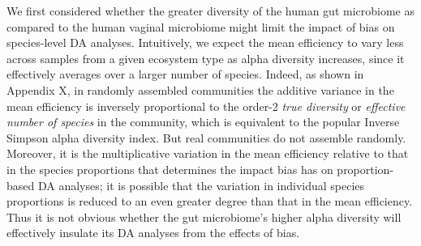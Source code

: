 \documentclass[
]{article}
\begin{document}
We first considered whether the greater diversity of the human gut microbiome as compared to the human vaginal microbiome might limit the impact of bias on species-level DA analyses.
Intuitively, we expect the mean efficiency to vary less across samples from a given ecosystem type as alpha diversity increases, since it effectively averages over a larger number of species.
Indeed, as shown in Appendix X, in randomly assembled communities the additive variance in the mean efficiency is inversely proportional to the order-2 \emph{true diversity} or \emph{effective number of species} in the community, which is equivalent to the popular Inverse Simpson alpha diversity index.
But real communities do not assemble randomly.
Moreover, it is the multiplicative variation in the mean efficiency relative to that in the species proportions that determines the impact bias has on proportion-based DA analyses; it is possible that the variation in individual species proportions is reduced to an even greater degree than that in the mean efficiency.
Thus it is not obvious whether the gut microbiome's higher alpha diversity will effectively insulate its DA analyses from the effects of bias.
\end{document}
